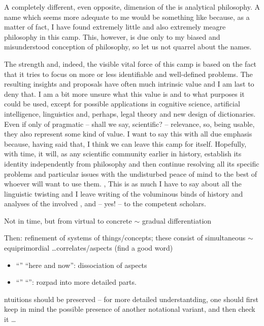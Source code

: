 {\pa A completely different, even opposite, dimension of the
 is analytical philosophy.  A name which seems
more adequate to me would be something like  because, as a matter of fact, I have found
extremely little and also extremely meagre philosophy in this camp. 
This, however, is due only to my biased and misunderstood conception
of philosophy, so let us not quarrel about the names.

The strength and, indeed, the visible vital force of this camp is
based on the fact that it tries to focus on more or less identifiable
and well-defined problems.  The resulting insights and proposals have
often much intrinsic value and I am last to deny that.  I am a bit
more unsure what this value is and to what purposes it could be used,
except for possible applications in cognitive science, artificial
intelligence, linguistics and, perhaps, legal theory and new design of
dictionaries.  Even if only of pragmatic -- shall we say, scientific? 
-- relevance, so, being usable, they also represent some kind of
value.  I want to say this with all due emphasis because, having said
that, I think we can leave this camp for itself.  Hopefully, with
time, it will, as any scientific community earlier in history,
establish its identity independently from philosophy and then continue
resolving all its specific problems and particular issues with the
undisturbed peace of mind to the best of whoever will want to use
them.
%
\sep 
%
\pa This is as much I have to say about all the linguistic twisting
and I leave writing of the voluminous binds of history and analyses of
the involved ,  and -- yes!  --
 to the competent scholars.

Not in time, but from virtual to concrete $\sim$ gradual 
differentiation

Then: refinement of systems of things/concepts; these consist of 
simultaneous $\sim$ equiprimordial \ldots correlates/aspects (find a good 
word)


\begin{itemize}
\item ``\herenow'' \impl ``here and now'': dissociation of aspects
\item ``'' \impl ``'': rozpad into 
more detailed parts.
\end{itemize}
ntuitions should be preserved -- for more detailed understantding, one 
should first keep in mind the possible presence of another notational 
variant, and then check it \ldots




} %
